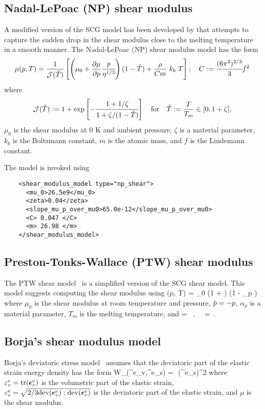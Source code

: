   \subsection{Nadal-LePoac (NP) shear modulus}
  A modified version of the SCG model has been developed by 
  \cite{Nadal2003} that attempts to capture the sudden drop in the
  shear modulus close to the melting temperature in a smooth manner.
  The Nadal-LePoac (NP) shear modulus model has the form
  \begin{equation} \label{eq:NPShear}
    \mu(p,T) = \frac{1}{\mathcal{J}(\hat{T})}
      \left[
        \left(\mu_0 + \frac{\displaystyle\partial \mu}{\displaystyle\partial p} \cfrac{p}{\eta^{1/3}} \right)
        (1 - \hat{T}) + \frac{\rho}{Cm}~k_b~T\right]; \quad
    C := \cfrac{(6\pi^2)^{2/3}}{3} f^2
  \end{equation}
  where
  \begin{equation}
    \mathcal{J}(\hat{T}) := 1 + \exp\left[-\cfrac{1+1/\zeta}
        {1+\zeta/(1-\hat{T})}\right] \quad
       \text{for} \quad \hat{T}:=\frac{T}{T_m}\in[0,1+\zeta],
  \end{equation}
  $\mu_0$ is the shear modulus at 0 K and ambient pressure, $\zeta$ is
  a material parameter, $k_b$ is the Boltzmann constant, $m$ is the atomic
  mass, and $f$ is the Lindemann constant.

  The model is invoked using
  \lstset{language=XML}
  \begin{lstlisting}
    <shear_modulus_model type="np_shear">
      <mu_0>26.5e9</mu_0>
      <zeta>0.04</zeta>
      <slope_mu_p_over_mu0>65.0e-12</slope_mu_p_over_mu0>
      <C> 0.047 </C>
      <m> 26.98 </m>
    </shear_modulus_model>
  \end{lstlisting}
  
  \subsection{Preston-Tonks-Wallace (PTW) shear modulus}
  The PTW shear model~\cite{Preston2003} is a simplified version of the SCG shear model.
  This model suggests computing the shear modulus using
  \Beq
    \mu(p, T) = \mu_0 \left(1 + \beta {}\right) \left(1 - \alpha_p \right)
  \Eeq
  where $\mu_0$ is the shear modulus at room temperature and pressure, $\pbar = -p$,
  $\alpha_p$ is a material parameter, $T_m$ is the melting temperature, and
  \Beq
    \eta =  ~,~~ \beta =  \,.
  \Eeq

  \subsection{Borja's shear modulus model}
  Borja's deviatoric stress model~\cite{borja1998} assumes that the deviatoric part of
  the elastic strain energy density has the form
  \Beq
    W_\Tdev(\Ve^e_v,\Ve^e_s) =  \,\mu\,(\Ve^e_s)^2
  \Eeq
  where $\varepsilon^e_v = \text{tr}(\boldsymbol{\epsilon}^e_v)$ is the volumetric part of the elastic strain, 
  $\varepsilon^e_s = \sqrt{2/3 \text{dev}(\boldsymbol{\epsilon}^e_v):\text{dev}(\boldsymbol{\epsilon}^e_v)}$ is the 
  deviatoric part of the elastic strain, and $\mu$ is the shear modulus.

